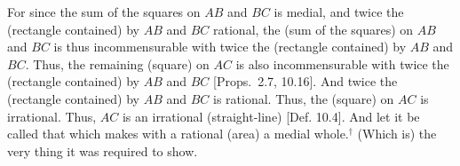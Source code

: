 \begin{Parallel}{}{}
{For since the sum of the squares on $AB$ and $BC$ is medial, and
twice the (rectangle contained) by $AB$ and $BC$ rational,
the (sum of the squares) on $AB$ and $BC$ is thus incommensurable
with twice the (rectangle contained) by $AB$ and $BC$. Thus, the
remaining (square) on $AC$ is also incommensurable with
twice the (rectangle contained) by $AB$ and $BC$ [Props.~2.7, 10.16]. And twice
the (rectangle contained) by $AB$ and $BC$ is rational. 
Thus, the (square) on $AC$ is irrational. Thus, $AC$ is an
irrational (straight-line) [Def. 10.4]. And let it be
called that which makes
with a rational (area) a medial whole.$^\dag$ (Which is) the very thing it
was required to show.}
\end{Parallel}


\vspace{7pt}{\footnotesize\noindent$^\dag$ See footnote to Prop.~10.40.}

